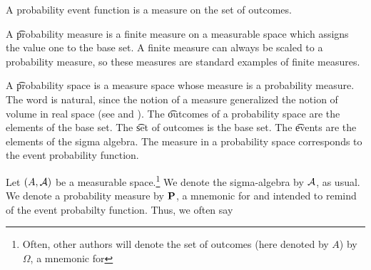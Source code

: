 

A probability event function is a measure on the set of outcomes.


A \t{probability measure} is a finite measure on a measurable space which assigns the value one to the base set.
A finite measure can always be scaled to a probability measure, so these measures are standard examples of finite measures.

A \t{probability space} is a measure space whose measure is a probability measure.
The word  is natural, since the notion of a measure generalized the notion of volume in real space (see  and ).
The \t{outcomes} of a probability space are the elements of the base set.
The \t{set of outcomes} is the base set.
The \t{events} are the elements of the sigma algebra.
The measure in a probability space corresponds to the event probability function.



Let $(A, \mathcal{A})$ be a measurable space.\footnote{Often, other authors will denote the set of outcomes (here denoted by $A$) by $\Omega$, a mnemonic for }
We denote the sigma-algebra by $\mathcal{A}$, as usual.
We denote a probability measure by $\mathbf{P}$, a mnemonic for  and intended to remind of the event probabilty function.
Thus, we often say 

